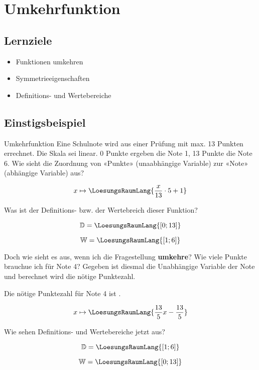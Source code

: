 \section{Umkehrfunktion}

\subsection{Lernziele}

\begin{itemize}
\item Funktionen umkehren
\item Symmetrieeigenschaften
\item Definitions- und Wertebereiche
\end{itemize} 
\newpage

\subsection{Einstigsbeispiel}
\begin{beispiel}{Umkehrfunktion}{}
  Eine Schulnote wird aus einer Prüfung mit max. 13 Punkten errechnet.
  Die Skala sei linear. 0 Punkte ergeben die Note 1, 13 Punkte die
  Note 6. Wie sieht die Zuordnung von «Punkte» (unaabhängige Variable)
  zur «Note» (abhängige Variable) aus?

  \leserluft
  
  $$x \mapsto  \LoesungsRaumLang{\frac{x}{13}\cdot{} 5 + 1}$$

  Was ist der Definitions- bzw. der Wertebreich dieser Funktion?

  \leserluft
  
  $$\mathbb{D} = \LoesungsRaumLang{[0; 13]}$$

  \leserluft
  
  $$\mathbb{W} = \LoesungsRaumLang{[1; 6]}$$

  Doch wie sieht es aus, wenn ich die Fragestellung \textbf{umkehre}?
  Wie viele Punkte brauchue ich für Note 4? Gegeben ist diesmal die
  Unabhängige Variable der Note und berechnet wird die nötige
  Punktezahl.

  \leserluft{}
  
  Die nötige Punktezahl für Note 4 ist .

  \leserluft{}
  
  $$x \mapsto \LoesungsRaumLang{\frac{13}5 x - \frac{13}5}$$

    Wie sehen Definitions- und Wertebereiche jetzt aus?

    $$\mathbb{D} = \LoesungsRaumLang{ [1; 6] }$$


    $$\mathbb{W} = \LoesungsRaumLang{ [0;13] }$$
  
\end{beispiel}
\newpage

